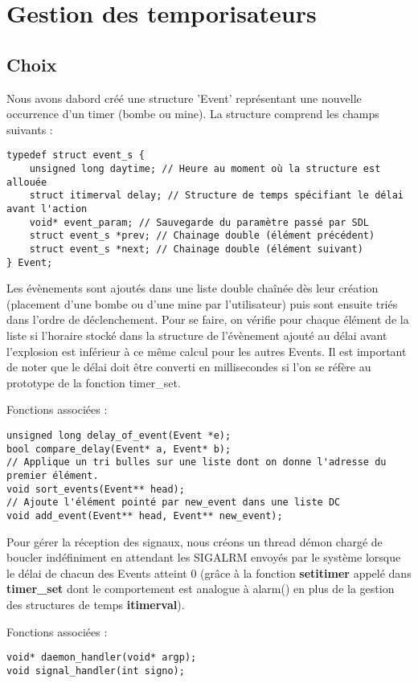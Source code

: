 \documentclass[a4paper]{article}
\begin{document}
\section{Gestion des temporisateurs}
\subsection{Choix}
Nous avons dabord créé une structure 'Event' représentant une nouvelle occurrence d'un timer (bombe ou mine). La structure comprend les champs suivants :

\begin{verbatim}
typedef struct event_s {
    unsigned long daytime; // Heure au moment où la structure est allouée
    struct itimerval delay; // Structure de temps spécifiant le délai avant l'action
    void* event_param; // Sauvegarde du paramètre passé par SDL
    struct event_s *prev; // Chainage double (élément précédent)
    struct event_s *next; // Chainage double (élément suivant)
} Event;
\end{verbatim}

Les évènements sont ajoutés dans une liste double chaînée dès leur création (placement d'une bombe ou d'une mine par l'utilisateur) puis sont ensuite triés dans l'ordre de déclenchement. Pour se faire, on vérifie pour chaque élément de la liste si l'horaire stocké dans la structure de l'évènement ajouté au délai avant l'explosion est inférieur à ce même calcul pour les autres Events. Il est important de noter que le délai doit être converti en millisecondes si l'on se réfère au prototype de la fonction timer\_set.

Fonctions associées :
\begin{verbatim}
unsigned long delay_of_event(Event *e);
bool compare_delay(Event* a, Event* b);
// Applique un tri bulles sur une liste dont on donne l'adresse du premier élément.
void sort_events(Event** head);
// Ajoute l'élément pointé par new_event dans une liste DC 
void add_event(Event** head, Event** new_event);
\end{verbatim}

Pour gérer la réception des signaux, nous créons un thread démon chargé de boucler indéfiniment en attendant les SIGALRM envoyés par le système lorsque le délai de chacun des Events atteint 0 (grâce à la fonction \textbf{setitimer} appelé dans \textbf{timer\_set} dont le comportement est analogue à alarm() en plus de la gestion des structures de temps \textbf{itimerval}).

Fonctions associées :
\begin{verbatim}
void* daemon_handler(void* argp);
void signal_handler(int signo);
\end{verbatim}
\end{document}
